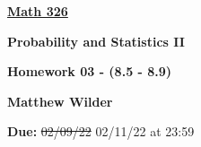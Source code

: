 \documentclass[12pt]{article}
\begin{document}
\pagestyle{fancy}
\fancyhf{}

\noindent \begin{center}{\Huge \textbf{\underline{Math 326}}}\end{center}
\begin{center}{\Large \textbf{Probability and Statistics II}}\end{center}
\begin{center}{\Large \textbf{Homework 03 - (8.5 - 8.9)}}\end{center}
\begin{center}{\Large \textbf{Matthew Wilder}}\end{center}
\begin{center}{\large \textbf{Due: } \sout{02/09/22}\hspace{.1in}  02/11/22 at 23:59}\end{center}
\vspace{1.25in}
\tableofcontents

\newpage



\newpage

\newpage

\newpage

\end{document}
